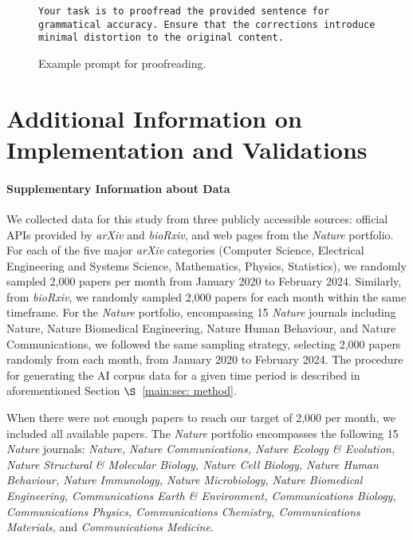 \documentclass{article}
\begin{document}
\begin{figure}[htb!]
\begin{lstlisting}
Your task is to proofread the provided sentence for grammatical accuracy. Ensure that the corrections introduce minimal distortion to the original content. 
\end{lstlisting}
\caption{
Example prompt for proofreading.
}
\label{fig:proofread-prompt}
\end{figure}

\clearpage









\section{Additional Information on Implementation and Validations}
\label{appendix:sec:implementation}


\paragraph{Supplementary Information about Data}
We collected data for this study from three publicly accessible sources: official APIs provided by \textit{arXiv} and \textit{bioRxiv}, and web pages from the \textit{Nature} portfolio. 
For each of the five major \textit{arXiv} categories (Computer Science, Electrical Engineering and Systems Science, Mathematics, Physics, Statistics), we randomly sampled 2,000 papers per month from January 2020 to February 2024. 
Similarly, from \textit{bioRxiv}, we randomly sampled 2,000 papers for each month within the same timeframe. 
For the \textit{Nature} portfolio, encompassing 15 \textit{Nature} journals including Nature, Nature Biomedical Engineering, Nature Human Behaviour, and Nature Communications, we followed the same sampling strategy, selecting 2,000 papers randomly from each month, from January 2020 to February 2024. 
The procedure for generating the AI corpus data for a given time period is described in aforementioned Section $\S$~\ref{main:sec: method}. 


When there were not enough papers to reach our target of 2,000 per month, we included all available papers. 
The \textit{Nature} portfolio encompasses the following 15 \textit{Nature} journals: 
\textit{Nature, 
Nature Communications, 
Nature Ecology \& Evolution, 
Nature Structural \& Molecular Biology, 
Nature Cell Biology, 
Nature Human Behaviour, 
Nature Immunology, 
Nature Microbiology, 
Nature Biomedical Engineering, 
Communications Earth \& Environment, 
Communications Biology, 
Communications Physics, 
Communications Chemistry,
Communications Materials,}
and \textit{Communications Medicine}. 
\end{document}

